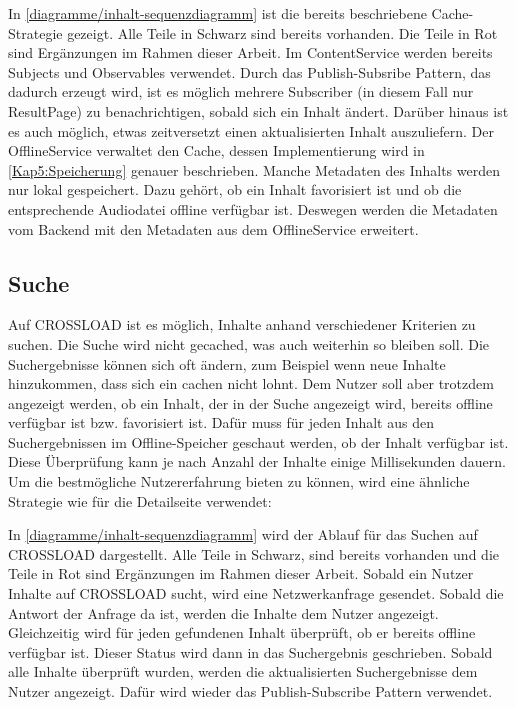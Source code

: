 
In \autoref{diagramme/inhalt-sequenzdiagramm} ist die bereits beschriebene Cache-Strategie gezeigt. Alle Teile in Schwarz sind bereits vorhanden. Die Teile in Rot sind Ergänzungen im Rahmen dieser Arbeit. Im ContentService werden bereits Subjects und Observables verwendet. Durch das Publish-Subsribe Pattern, das dadurch erzeugt wird, ist es möglich mehrere Subscriber (in diesem Fall nur ResultPage) zu benachrichtigen, sobald sich ein Inhalt ändert. Darüber hinaus ist es auch möglich, etwas zeitversetzt einen aktualisierten Inhalt auszuliefern. Der OfflineService verwaltet den Cache, dessen Implementierung wird in \autoref{Kap5:Speicherung} genauer beschrieben. Manche Metadaten des Inhalts werden nur lokal gespeichert. Dazu gehört, ob ein Inhalt favorisiert ist und ob die entsprechende Audiodatei offline verfügbar ist. Deswegen werden die Metadaten vom Backend mit den Metadaten aus dem OfflineService erweitert.

\subsection{Suche}
Auf CROSSLOAD ist es möglich, Inhalte anhand verschiedener Kriterien zu suchen. Die Suche wird nicht gecached, was auch weiterhin so bleiben soll. Die Suchergebnisse können sich oft ändern, zum Beispiel wenn neue Inhalte hinzukommen, dass sich ein cachen nicht lohnt. Dem Nutzer soll aber trotzdem angezeigt werden, ob ein Inhalt, der in der Suche angezeigt wird, bereits offline verfügbar ist bzw. favorisiert ist. Dafür muss für jeden Inhalt aus den Suchergebnissen im Offline-Speicher geschaut werden, ob der Inhalt verfügbar ist. Diese Überprüfung kann je nach Anzahl der Inhalte einige Millisekunden dauern. Um die bestmögliche Nutzererfahrung bieten zu können, wird eine ähnliche Strategie wie für die Detailseite verwendet:


In \autoref{diagramme/inhalt-sequenzdiagramm} wird der Ablauf für das Suchen auf CROSSLOAD dargestellt. Alle Teile in Schwarz, sind bereits vorhanden und die Teile in Rot sind Ergänzungen im Rahmen dieser Arbeit. Sobald ein Nutzer Inhalte auf CROSSLOAD sucht, wird eine Netzwerkanfrage gesendet. Sobald die Antwort der Anfrage da ist, werden die Inhalte dem Nutzer angezeigt. Gleichzeitig wird für jeden gefundenen Inhalt überprüft, ob er bereits offline verfügbar ist. Dieser Status wird dann in das Suchergebnis geschrieben. Sobald alle Inhalte überprüft wurden, werden die aktualisierten Suchergebnisse dem Nutzer angezeigt. Dafür wird wieder das Publish-Subscribe Pattern verwendet. 

